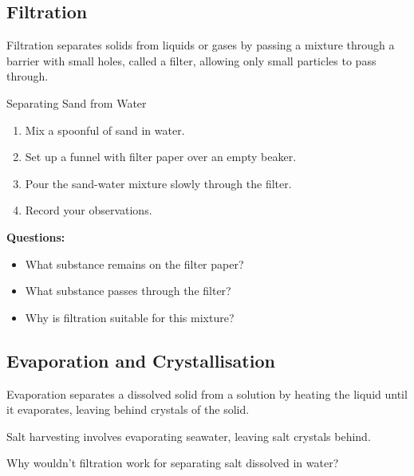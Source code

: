 \subsection{Filtration}
Filtration separates solids from liquids or gases by passing a mixture through a barrier with small holes, called a filter, allowing only small particles to pass through.

\begin{marginfigure}
\centering
\caption{Filtration separates insoluble solids from liquids.}
\label{fig:filtration}
\end{marginfigure}

\begin{investigation}{Separating Sand from Water}
\begin{enumerate}
    \item Mix a spoonful of sand in water.
    \item Set up a funnel with filter paper over an empty beaker.
    \item Pour the sand-water mixture slowly through the filter.
    \item Record your observations.
\end{enumerate}

\textbf{Questions:}
\begin{itemize}
    \item What substance remains on the filter paper?
    \item What substance passes through the filter?
    \item Why is filtration suitable for this mixture?
\end{itemize}
\end{investigation}

\subsection{Evaporation and Crystallisation}
Evaporation separates a dissolved solid from a solution by heating the liquid until it evaporates, leaving behind crystals of the solid.

\begin{example}
Salt harvesting involves evaporating seawater, leaving salt crystals behind.
\end{example}

\begin{stopandthink}
Why wouldn't filtration work for separating salt dissolved in water?
\end{stopandthink}

